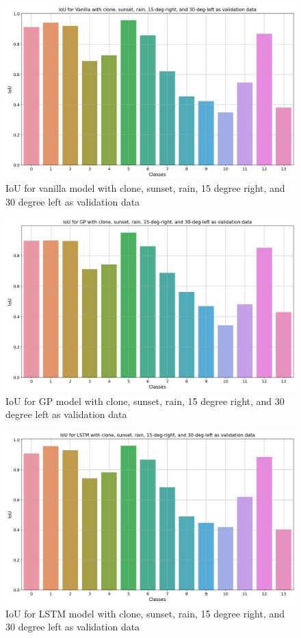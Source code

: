 	\begin{figure}
		\centering
	
		\includegraphics[width=12cm]{images/iou_vanilla_vkitti_five.png}
		\caption{IoU for vanilla model with clone, sunset, rain, 15 degree right, and 30 degree left as validation data}
		\label{fig:performance_metric_unet}
	\end{figure}
	
	\begin{figure}
		\centering
		
		\includegraphics[width=12cm]{images/IoU_vkitti_GP_five.png}
		\caption{IoU for GP model with clone, sunset, rain, 15 degree right, and 30 degree left as validation data}
		\label{fig:performance_metric_unet}
	\end{figure}

	\begin{figure}
		\centering
	
		\includegraphics[width=12cm]{images/IoU_vkitti_lstm_five.png}
		\caption{IoU for LSTM model with clone, sunset, rain, 15 degree right, and 30 degree left as validation data}
		\label{fig:performance_metric_unet}
	\end{figure}

